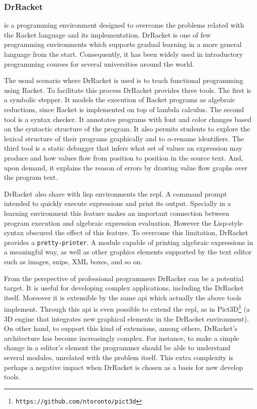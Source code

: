 \subsubsection{DrRacket~\cite{findler2002drscheme}} is a programming environment designed to overcome the problems related with the Racket language and its implementation. DrRacket is one of few programming environments which supports gradual learning in a more general language from the start. Consequently, it has been widely used in introductory programming courses for several universities around the world.

The usual scenario where DrRacket is used is to teach functional programming using Racket. To facilitate this process DrRacket provides three tools. The first is a symbolic stepper. It models the execution of Racket programs as algebraic reductions, since Racket is implemented on top of lambda calculus. The second tool is a syntax checker. It annotates programs with font and color changes based on the syntactic structure of the program. It also permits students to explore the lexical structure of their programs graphically and to $\alpha$-rename identifiers. The third tool is a static debugger that infers what set of values an expression may produce and how values flow from position to position in the source text. And, upon demand, it explains the reason of errors by drawing value flow graphs over the program text.

DrRacket also share with lisp environments the \ac{repl}. A command prompt intended to quickly execute expressions and print its output. Specially in a learning environment this feature makes an important connection between program execution and algebraic expression evaluation. However the Lisp-style syntax obscured the effect of this feature. To overcome this limitation, DrRacket provides a \texttt{pretty-printer}. A module capable of printing algebraic expressions in a meaningful way, as well as other graphics elements supported by the text editor such as images, snips, XML boxes, and so on.

From the perspective of professional programmers DrRacker can be a potential target. It is useful for developing complex applications, including the DrRacket itself. Moreover it is extensible by the same \ac{api} which actually the above tools implement. Through this \ac{api} is even possible to extend the \ac{repl}, as in Pict3D\footnote{\texttt{https://github.com/ntoronto/pict3d}} (a 3D engine that integrates new graphical elements in the DrRacket environment). On other hand, to support this kind of extensions, among others, DrRacket's architecture has become increasingly complex. For instance, to make a simple change in a editor's element the programmer should be able to understand several modules, unrelated with the problem itself. This extra complexity is perhaps a negative impact when DrRacket is chosen as a basis for new develop tools.

